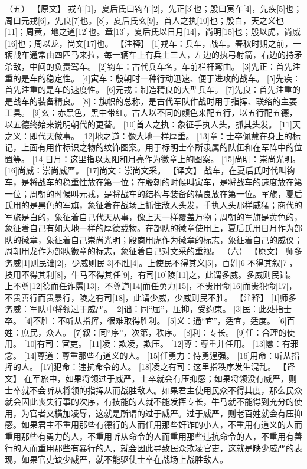 \documentclass[a4paper,12pt,UTF8,twoside]{ctexbook}
\begin{document}
（五）
【原文】
戎车[1]，夏后氏曰钩车[2]，先正[3]也；殷曰寅车[4]，先疾[5]也；周曰元戎[6]，先良[7]也。[8]，夏后氏玄[9]，首人之执[10]也；殷白，天之义也[11]；周黄，地之道[12]也。章[13]，夏后氏以日月[14]，尚明[15]也；殷以虎，尚威[16]也；周以龙，尚文[17]也。
【注释】
[1]戎车：兵车，战车。春秋时期之前，一辆战车通常由四匹马来拉，每一辆车上有兵士三人，左边的执弓射箭，右边的持矛杀敌，中间的负责驾车。
[2]钩车：古代兵车名。车前栏杆弯曲。
[3]先正：首先注重的是车的稳定性。
[4]寅车：殷朝时一种行动迅速、便于进攻的战车。
[5]先疾：首先注重的是车的速度性。
[6]元戎：制造精良的大型兵车。
[7]先良：首先注重的是战车的装备精良。
[8]：旗帜的总称，是古代军队作战时用于指挥、联络的主要工具。
[9]玄：赤黑色，黑中带红。古人以不同的颜色来配五行，以五行配五德，以五德终始来说明朝代的更替。
[10]首人之执：象征手执人头，抓其头发。
[11]天之义：即代天做事。
[12]地之道：像大地一样厚重。
[13]章：士卒佩戴在身上的标记，上面有用作标识之物的纹饰图案。用于标明士卒所隶属的队伍和在军阵中的位置等。
[14]日月：这里指以太阳和月亮作为徽章上的图案。
[15]尚明：崇尚光明。
[16]尚威：崇尚威严。
[17]尚文：崇尚文采。
【译文】
战车，在夏后氏时代叫钩车，是将战车的稳重性放在第一位；在殷朝的时候叫寅车，是将战车的速度放在第一位；周朝的时候叫元戎，是将战车的结构与装备的精良放在第一位。军旗，夏后氏用的是黑色的军旗，象征着在战场上抓住敌人头发，手执人头那样威猛；商代的军旅是白的，象征着自己代天从事，像上天一样覆盖万物；周朝的军旗是黄色的，象征着自己有如大地一样的厚德载物。在部队的徽章使用上，夏后氏用日月作为部队的徽章，象征着自己崇尚光明；殷商用虎作为徽章的标志，象征着自己的威仪；周朝用龙作为部队徽章的标志，象征着自己对文采的重视。
（六）
【原文】
师多务威[1]则民诎[2]，少威则民[3]不胜[4]。上使民不得其义[5]，百姓[6]不得其叙[7]，技用不得其利[8]，牛马不得其任[9]，有司[10]陵[11]之，此谓多威。多威则民诎。上不尊[12]德而任诈慝[13]，不尊道[14]而任勇力[15]，不贵用命[16]而贵犯命[17]，不贵善行而贵暴行，陵之有司[18]，此谓少威，少威则民不胜。
【注释】
[1]师多务威：军队中将领过于威严。
[2]诎：同“屈”，压抑，受约束。
[3]民：此处指士卒。
[4]不胜：不听从指挥，很难取得胜利。
[5]义：通“宜”，适宜，适度。
[6]百姓：庶民，众人。
[7]叙：同“序”，次第，秩序。
[8]利：专长。
[9]任：合理的使用。
[10]有司：官吏。
[11]凌：欺凌，欺压。
[12]尊：尊重并任用。
[13]慝：有邪念。
[14]尊道：尊重那些有道义的人。
[15]任勇力：恃勇逞强。
[16]用命：听从指挥的人。
[17]犯命：违抗命令的人。
[18]凌之有司：这里指秩序发生混乱。
【译文】
在军旅中，如果将领过于威严，士卒就会有压抑感；如果将领没有威严，则士卒就不会听从将领的指挥从而战胜敌人。如果君主使用民众不得其度，那么民众就会因此丧失行事的次序，有技能的人就不能发挥专长，牛马就不能得到充分的使用，为官者又横加凌辱，这就是所谓的过于威严。过于威严，则老百姓就会有压抑感。如果君主不重用那些有德行的人而任用那些奸诈的小人，不重用有道义的人而重用那些有勇力的人，不重用听从命令的人而重用那些违抗命令的人，不重用有善行的人而重用那些有暴行的人，就会因此导致民众欺凌官吏，这就是缺少威严的表现，如果官吏缺少威严，就不能驱使士卒在战场上战胜敌人。
\end{document}
